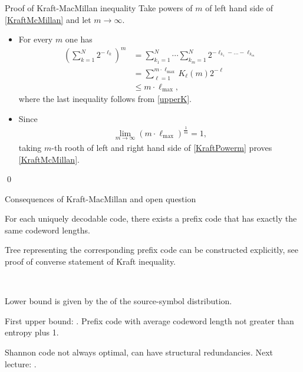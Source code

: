 \begin{frame}{Proof of Kraft-MacMillan inequality}
 Take powers of $m$ of left hand side of \eqref{KraftMcMillan} and let $m\to\infty$.
\begin{itemize}
\item %
 For every $m$ one has
\begin{align}\label{KraftPowerm}
\left(\sum_{k=1}^N 2^{-\ell_k}\right)^m & = \sum_{k_1=1}^N\cdots\sum_{k_m=1}^N2^{-\ell_{k_1}-\dots-\ell_{k_m}} \nonumber\\
&=\sum_{\ell=1}^{m\cdot \ell_{\max}}K_{\ell}(m)2^{-\ell}\nonumber\\
&\leq m\cdot \ell_{\max},
\end{align}
where the last inequality follows from \eqref{upperK}.
\item Since 
\begin{align*}
\lim_{m\to\infty}(m\cdot\ell_{\max})^{\frac{1}{m}}=1,
\end{align*} 
taking $m$-th rooth of left and right hand side of \eqref{KraftPowerm} proves \eqref{KraftMcMillan}. 
\end{itemize}
\qed 
\end{frame}







\begin{frame}{Consequences of Kraft-MacMillan and open question} 


\bit 
\item For each uniquely decodable code, there exists a prefix code that has exactly the same codeword lengths.
\item Tree representing the corresponding prefix code can be constructed explicitly, see proof of converse statement of Kraft inequality. 
\eit

\\
\smallskip
\smallskip
{}
\bit
\item Lower bound is given by the  of the source-symbol distribution.
\item First upper bound: . Prefix code with average codeword length not greater than entropy plus 1.
\item Shannon code not always optimal, can have structural redundancies. Next lecture: . 
\eit 


\end{frame}

